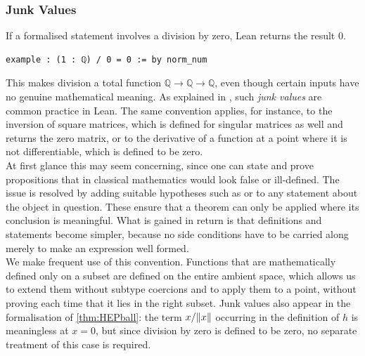 \documentclass[11pt, a4paper, english]{article}
\DeclarePairedDelimiter\norm{\lVert}{\rVert}
\theoremstyle{plain}
\theoremstyle{definition}
\theoremstyle{remark}
\numberwithin{equation}{section}
\numberwithin{theorem}{section}
\begin{document}
\subsubsection{Junk Values} \label{subsubsec:junkvalues}
If a formalised statement involves a division by zero, Lean returns the result $0$.
\begin{verbatim}
example : (1 : ℚ) / 0 = 0 := by norm_num
\end{verbatim}
This makes division a total function $\mathbb{Q} \to \mathbb{Q} \to \mathbb{Q}$, even though certain inputs have no genuine mathematical meaning. As explained in \cite{Meiburg}, such \emph{junk values} are common practice in Lean. The same convention applies, for instance, to the inversion of square matrices, which is defined for singular matrices as well and returns the zero matrix, or to the derivative of a function at a point where it is not differentiable, which is defined to be zero. \\
At first glance this may seem concerning, since one can state and prove propositions that in classical mathematics would look false or ill-defined. The issue is resolved by adding suitable hypotheses such as  or  to any statement about the object in question. These ensure that a theorem can only be applied where its conclusion is meaningful. What is gained in return is that definitions and statements become simpler, because no side conditions have to be carried along merely to make an expression well formed.\\
We make frequent use of this convention. Functions that are mathematically defined only on a subset are defined on the entire ambient space, which allows us to extend them without subtype coercions and to apply them to a point, without proving each time that it lies in the right subset. Junk values also appear in the formalisation of \cref{thm:HEPball}: the term $x / \norm{x}$ occurring in the definition of $h$ is meaningless at $x = 0$, but since division by zero is defined to be zero, no separate treatment of this case is required.
\end{document}
